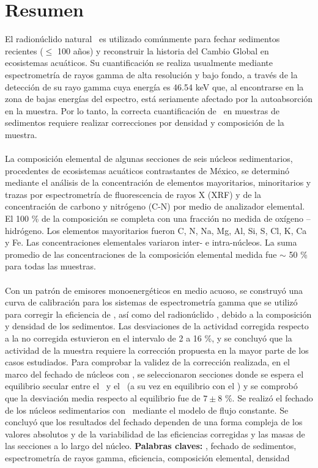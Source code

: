 {}
\chapter*{Resumen}
\lettrine{E}{}l radionúclido natural \PbCero\, es utilizado comúnmente para fechar sedimentos recientes ($\leq$ 100 años) y reconstruir la historia del Cambio Global en ecosistemas acuáticos. Su cuantificación se realiza usualmente mediante espectrometría de rayos gamma de alta resolución y bajo fondo, a través de la detección de su rayo gamma cuya energía es 46.54 keV que, al encontrarse en la zona de bajas energías del espectro, está seriamente afectado por la autoabsorción en la muestra. Por lo tanto, la correcta cuantificación de \PbCero\, en muestras de sedimentos requiere realizar correcciones por densidad y composición de la muestra. 
\\ \\
La composición elemental de algunas secciones de seis núcleos sedimentarios, procedentes de ecosistemas acuáticos contrastantes de México, se determinó mediante el análisis de la concentración de elementos mayoritarios, minoritarios y trazas por  espectrometría de fluorescencia de rayos X (XRF) y de la concentración de carbono y nitrógeno (C-N) por medio de analizador elemental. El 100 \% de la composición se completa con una fracción no medida de oxígeno – hidrógeno. Los elementos mayoritarios fueron C, N, Na, Mg, Al, Si, S, Cl, K, Ca y Fe. Las concentraciones elementales variaron inter- e intra-núcleos. La suma promedio de las concentraciones de la composición elemental medida fue $\sim$ 50 \% para todas las muestras.
\\ \\
Con un patrón de emisores monoenergéticos en medio acuoso, se construyó una curva de calibración para los sistemas de espectrometría gamma que se utilizó para corregir la eficiencia de \PbCero, así como del radionúclido \PbCuatro, debido a la composición y densidad de los sedimentos. Las desviaciones de la actividad corregida respecto a la no corregida estuvieron en el intervalo de 2 a 16 \%, y se concluyó que la actividad de la muestra requiere la corrección propuesta en la mayor parte de los casos estudiados. Para comprobar la validez de la corrección realizada, en el marco del fechado de núcleos con \PbCero, se seleccionaron secciones donde se espera el equilibrio secular entre el \PbCero\, y el \PbCuatro\, (a su vez en equilibrio con el \Ra) y se comprobó que la desviación media respecto al equilibrio fue de $7 \pm 8$ \%. Se realizó el fechado de los núcleos sedimentarios con \PbCero\, mediante el modelo de flujo constante. Se concluyó que los resultados del fechado dependen de una forma compleja de los valores absolutos y de la variabilidad de las eficiencias corregidas y las masas de las secciones a lo largo del núcleo. 
\newpage
\textbf{Palabras claves:} \PbCero, fechado de sedimentos, espectrometría de rayos gamma, eficiencia, composición elemental, densidad